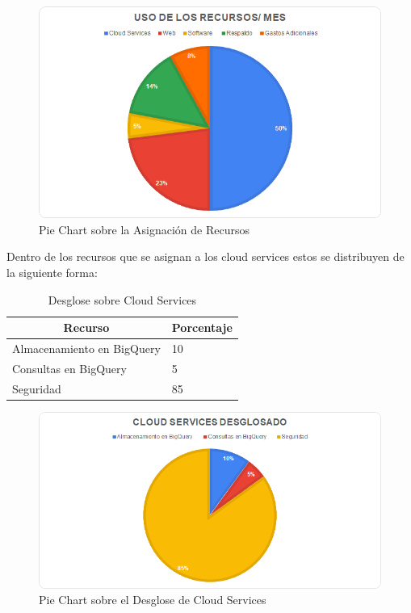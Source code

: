 \documentclass[12pt,a4paper,openright]{article}
\begin{document}
\begin{figure}[ht]
\includegraphics[width=15cm]{TC1.png}
\centering
\caption{Pie Chart sobre la Asignaci\'on de Recursos}
\end{figure}

Dentro de los recursos que se asignan a los cloud services estos se distribuyen de la siguiente forma:

\begin{table}[ht]
\centering
\begin{tabular}{|l|l|}
\hline
\multicolumn{1}{|c|}{\textbf{Recurso}} & \multicolumn{1}{c|}{\textbf{Porcentaje}} \\ \hline \hline
Almacenamiento en BigQuery             & 10                                       \\ \hline
Consultas en BigQuery                  & 5                                        \\ \hline
Seguridad                              & 85                                       \\ \hline
\end{tabular}
\caption{Desglose sobre Cloud Services}
\end{table}

\begin{figure}[ht]
\includegraphics[width=15cm]{TC2.png}
\centering
\caption{Pie Chart sobre el Desglose de Cloud Services}
\end{figure}
\end{document}
